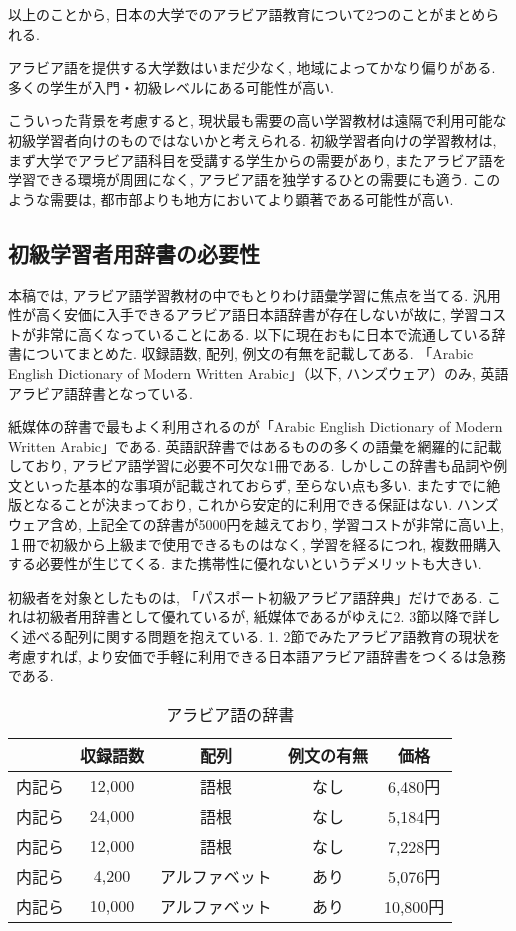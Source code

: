 \documentclass[technicalreport]{ieicej}
\begin{document}
以上のことから, 日本の大学でのアラビア語教育について2つのことがまとめられる. 

アラビア語を提供する大学数はいまだ少なく, 地域によってかなり偏りがある. 
多くの学生が入門・初級レベルにある可能性が高い. 

こういった背景を考慮すると, 現状最も需要の高い学習教材は遠隔で利用可能な初級学習者向けのものではないかと考えられる. 初級学習者向けの学習教材は, まず大学でアラビア語科目を受講する学生からの需要があり, またアラビア語を学習できる環境が周囲になく, アラビア語を独学するひとの需要にも適う. このような需要は, 都市部よりも地方においてより顕著である可能性が高い.

\subsection{初級学習者用辞書の必要性}
本稿では, アラビア語学習教材の中でもとりわけ語彙学習に焦点を当てる. 汎用性が高く安価に入手できるアラビア語日本語辞書が存在しないが故に, 学習コストが非常に高くなっていることにある. 以下に現在おもに日本で流通している辞書についてまとめた. 収録語数, 配列, 例文の有無を記載してある. 「Arabic English Dictionary of Modern Written Arabic」（以下, ハンズウェア）のみ, 英語アラビア語辞書となっている.

紙媒体の辞書で最もよく利用されるのが「Arabic English Dictionary of Modern Written Arabic」である. 英語訳辞書ではあるものの多くの語彙を網羅的に記載しており, アラビア語学習に必要不可欠な1冊である. しかしこの辞書も品詞や例文といった基本的な事項が記載されておらず, 至らない点も多い. またすでに絶版となることが決まっており, これから安定的に利用できる保証はない. ハンズウェア含め, 上記全ての辞書が5000円を越えており, 学習コストが非常に高い上, １冊で初級から上級まで使用できるものはなく, 学習を経るにつれ, 複数冊購入する必要性が生じてくる. また携帯性に優れないというデメリットも大きい. 

初級者を対象としたものは, 「パスポート初級アラビア語辞典」だけである. これは初級者用辞書として優れているが, 紙媒体であるがゆえに2. 3節以降で詳しく述べる配列に関する問題を抱えている. 
1. 2節でみたアラビア語教育の現状を考慮すれば, より安価で手軽に利用できる日本語アラビア語辞書をつくるは急務である. 
\begin{table}[tb]
\caption{アラビア語の辞書}
\label{table:1}
\begin{center}
 \begin{tabular}{c|c|c|c|c}
   & 収録語数 & 配列 & 例文の有無 & 価格 \\
 \hline
  内記ら &12,000& 語根 & なし & 6,480円\\
  内記ら &24,000&語根 & なし & 5,184円\\
  内記ら &12,000& 語根 & なし & 7,228円\\
  内記ら &4,200& アルファベット & あり & 5,076円\\
  内記ら &10,000& アルファベット & あり & 10,800円\\
   \hline
 \end{tabular}
\end{center}
\end{table}
\end{document}
